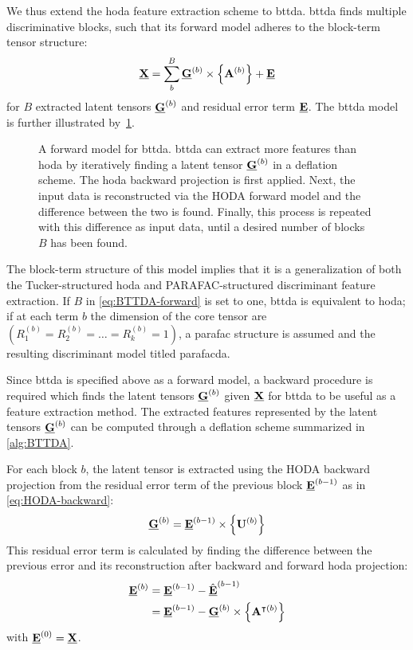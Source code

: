 \documentclass[twocolumn]{article}
\begin{document}
We thus extend the \ac{hoda} feature extraction scheme to \acf{bttda}.
\Ac{bttda} finds multiple discriminative blocks, such that its forward
model adheres to the block-term tensor structure:
\begin{equation}
	\underline{\mathbf{X}} = \sum_b^B\underline{\mathbf{G}}^{(b)}\times\left\{\mathbf{A}^{(b)}\right\} + \underline{\mathbf{E}}
	\label{eq:BTTDA-forward}
\end{equation}
for $B$ extracted latent tensors $\underline{\mathbf{G}}^{(b)}$ and residual error term
$\underline{\mathbf{E}}$.
The \ac{bttda} model is further illustrated by~\cref{fig:BTTDA}.
\begin{figure*}[t]
	\centering
	
	\caption[A forward model for \acs{bttda}.]{A forward model for \acf{bttda}.
		\Ac{bttda} can extract more features
		than \ac{hoda} by iteratively finding a latent tensor $\underline{\mathbf{G}}^{(b)}$ in a
		deflation scheme.
		The \ac{hoda} backward projection is first applied. Next, the
		input data is reconstructed via the HODA forward model and the
		difference between the two is found.
		Finally, this process is repeated with this difference as input data, until a
		desired number of blocks $B$ has been found.}
	\label{fig:BTTDA}
\end{figure*}
The block-term structure of this model implies that it is a generalization of both
the Tucker-structured \ac{hoda} and PARAFAC-structured discriminant feature
extraction.
If $B$ in \cref{eq:BTTDA-forward} is set to one, \ac{bttda} is equivalent to
\ac{hoda}; if at each term $b$ the dimension of the core tensor are
$(R_1^{(b)}=R_2^{(b)}=\ldots=R_k^{(b)}=1)$, a \ac{parafac} structure is assumed and
the resulting discriminant model titled \ac{parafacda}.

Since \ac{bttda} is specified above as a forward model, a backward procedure
is required which finds the latent tensors $\underline{\mathbf{G}}^{(b)}$ given $\underline{\mathbf{X}}$ for
\ac{bttda} to be useful as a feature extraction method.
The extracted features represented by the latent tensors $\underline{\mathbf{G}}^{(b)}$ can be
computed through a deflation scheme summarized in \cref{alg:BTTDA}.
\begin{algorithm}
	\caption{\Ac{bttda} feature extraction.}
	\label{alg:BTTDA}
	
\end{algorithm}
For each block $b$, the latent tensor is extracted using the HODA backward
projection from the residual error term of the previous
block $\underline{\mathbf{E}}^{(b-1)}$ as in \cref{eq:HODA-backward}:
\begin{equation}
	\underline{\mathbf{G}}^{(b)} = \underline{\mathbf{E}}^{(b-1)}\times\left\{\mathbf{U}^{(b)}\right\}
\end{equation}
This residual error term is calculated by finding the difference between the
previous error and its reconstruction after backward and forward \ac{hoda}
projection:
\begin{align}
	\underline{\mathbf{E}}^{(b)}
	 & = \underline{\mathbf{E}}^{(b-1)} - \hat{\underline{\mathbf{E}}}^{(b-1)}                      \\
	 & = \underline{\mathbf{E}}^{(b-1)} - \underline{\mathbf{G}}^{(b)}\times\left\{\mathbf{A}^{\intercal(b)}\right\}
\end{align}
with $\underline{\mathbf{E}}^{(0)}=\underline{\mathbf{X}}$.
\end{document}

